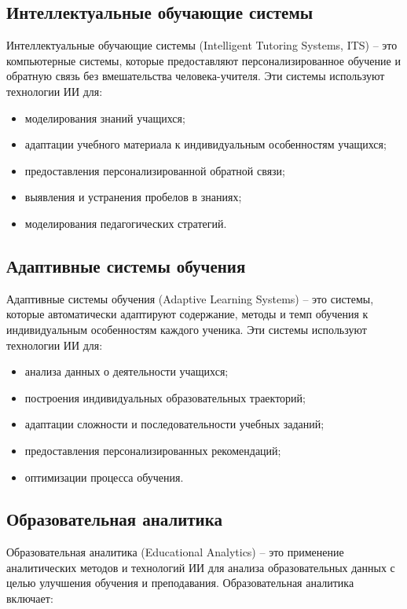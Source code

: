 \documentclass[a4paper,14pt]{extreport}
\begin{document}
\subsection{Интеллектуальные обучающие системы}

Интеллектуальные обучающие системы (Intelligent Tutoring Systems, ITS) – это компьютерные системы, которые предоставляют персонализированное обучение и обратную связь без вмешательства человека-учителя. Эти системы используют технологии ИИ для:

\begin{itemize}
    \item моделирования знаний учащихся;
    \item адаптации учебного материала к индивидуальным особенностям учащихся;
    \item предоставления персонализированной обратной связи;
    \item выявления и устранения пробелов в знаниях;
    \item моделирования педагогических стратегий.
\end{itemize}
\subsection{Адаптивные системы обучения}

Адаптивные системы обучения (Adaptive Learning Systems) – это системы, которые автоматически адаптируют содержание, методы и темп обучения к индивидуальным особенностям каждого ученика. Эти системы используют технологии ИИ для:

\begin{itemize}
    \item анализа данных о деятельности учащихся;
    \item построения индивидуальных образовательных траекторий;
    \item адаптации сложности и последовательности учебных заданий;
    \item предоставления персонализированных рекомендаций;
    \item оптимизации процесса обучения.
\end{itemize}

\subsection{Образовательная аналитика}

Образовательная аналитика (Educational Analytics) – это применение аналитических методов и технологий ИИ для анализа образовательных данных с целью улучшения обучения и преподавания. Образовательная аналитика включает:
\end{document}
